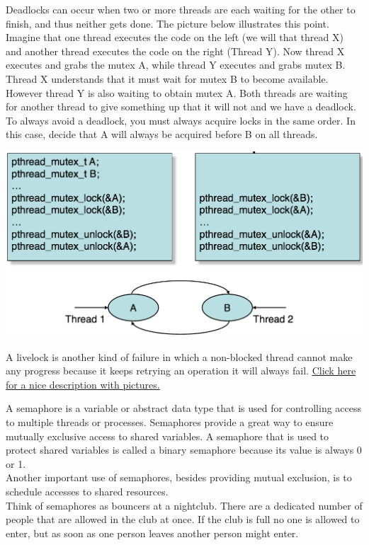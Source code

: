 Deadlocks can occur when two or more threads are each waiting for the other to finish, and thus neither gets done.  The picture below illustrates this point.  Imagine that one thread executes the code on the left (we will that thread X) and another thread executes the code on the right (Thread Y).  Now thread X executes and grabs the mutex A, while thread Y executes and grabs mutex B.  Thread X understands that it must wait for  mutex B to become available.  However thread Y is also waiting to obtain mutex A.  Both threads are waiting for another thread to give something up that it will not and we have a deadlock.  To always avoid a deadlock, you must always acquire locks in the same order.  In this case, decide that A will always be acquired before B on all threads.

\begin{center} %
    \includegraphics[scale=0.5]{threads/deadlock.png}
\end{center}

A livelock is another kind of failure in which a non-blocked thread cannot make any progress because it keeps retrying an operation it will always fail.
\href{http://www.guruzon.com/1/threading/multithreading-concepts/what-is-live-lock
}{Click here for a nice description with pictures.}




A semaphore is a variable or abstract data type that is used for controlling access to multiple threads or processes.  Semaphores provide a great way to ensure mutually exclusive access to shared variables.  A semaphore that is used to protect shared variables is called a binary semaphore because its value is always 0 or 1.\\

Another important use of semaphores, besides providing mutual exclusion, is to schedule accesses to shared resources.\\

Think of semaphores as bouncers at a nightclub. There are a dedicated number of people that are allowed in the club at once. If the club is full no one is allowed to enter, but as soon as one person leaves another person might enter.
